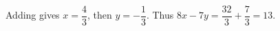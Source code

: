 Adding gives $x=\dfrac{4}{3}$, then $y=-\dfrac{1}{3}$. Thus $8x-7y=\dfrac{32}{3}+\dfrac{7}{3}=\boxed{13}$.
